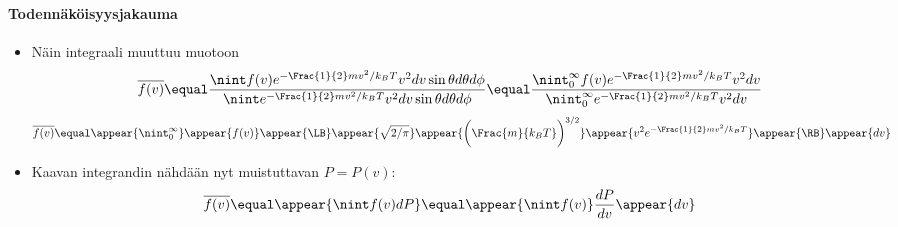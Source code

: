 \begin{frame}
\frametitle{\texorpdfstring{\culine[\sectiontitleulinecolor]{\sectiontitle}}{\sectiontitle} }
\framesubtitle{Todennäköisyysjakauma}

\appear{}

\begin{itemize}
	\item Näin integraali muuttuu muotoon
	\[
	\overline{f(v)}  \equal  \frac{ \nint f(v) e^{-\Frac{1}{2} m v^{2} / k_{B} T} v^{2} d v \sin \theta d \theta d  \phi }{ \nint e^{-\Frac{1}{2} m v^{2} / k_{B} T} v^{2} d v \sin \theta d \theta d  \phi }
	 \equal  \frac{ \nint_{0}^{\infty} f(v) e^{-\Frac{1}{2} m v^{2} / k_{B} T} v^{2} d v}{ \nint_{0}^{\infty} e^{-\Frac{1}{2} m v^{2} / k_{B} T} v^{2} d v}
	\]
     
\[
\overline{f(v)}  \equal  \appear{\nint_{0}^{\infty}  }\appear{f(v)} \appear{\LB} \appear{\sqrt{2/\pi}} \appear{\bigg( \Frac{m}{k_{B} T}  \bigg)^{3 / 2}} \appear{v^{2} e^{-\Frac{1}{2} m v^{2} / k_{B} T}}\appear{\RB} \appear{d v}
\]

\item Kaavan integrandin nähdään nyt muistuttavan  $P=P(v)$:
\[
\overline{f(v)}  \equal  \appear{\nint f(v) d P} \equal  \appear{\nint f(v)} \frac{d P}{d v} \appear{d v}
\]

\end{itemize}

\endofslide 
\end{frame}

